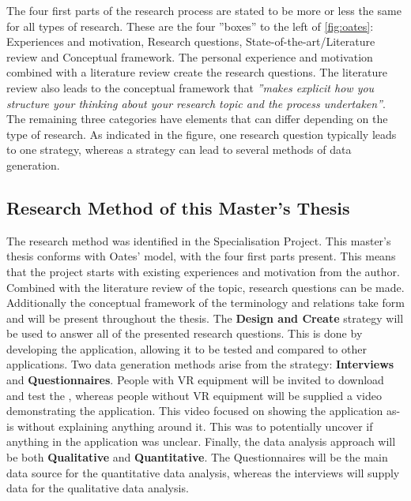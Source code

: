     The four first parts of the research process are stated to be more or less the same for all types of research. These are the four ''boxes'' to the left of \cref{fig:oates}: Experiences and motivation, Research questions, State-of-the-art/Literature review and Conceptual framework. The personal experience and motivation combined with a literature review create the research questions. The literature review also leads to the conceptual framework that \emph{''makes explicit how you structure your thinking about your research topic and the process undertaken''}. The remaining three categories have elements that can differ depending on the type of research. As indicated in the figure, one research question typically leads to one strategy, whereas a strategy can lead to several methods of data generation.
    
    \SPACE
    
    \subsection*{Research Method of this Master's Thesis}
    The research method was identified in the Specialisation Project\cite{specialisation}. This master's thesis conforms with Oates' model, with the four first parts present. This means that the project starts with existing experiences and motivation from the author. Combined with the literature review of the topic, research questions can be made. Additionally the conceptual framework of the terminology and relations take form and will be present throughout the thesis. The \textbf{Design and Create} strategy will be used to answer all of the presented research questions. This is done by developing the application, allowing it to be tested and compared to other applications.
    Two data generation methods arise from the strategy: \textbf{Interviews} and \textbf{Questionnaires}. People with VR equipment will be invited to download and test the \ApplicationName, whereas people without VR equipment will be supplied a video demonstrating the application. This video focused on showing the application as-is without explaining anything around it. This was to potentially uncover if anything in the application was unclear.
    Finally, the data analysis approach will be both \textbf{Qualitative} and \textbf{Quantitative}. The Questionnaires will be the main data source for the quantitative data analysis, whereas the interviews will supply data for the qualitative data analysis.
    
